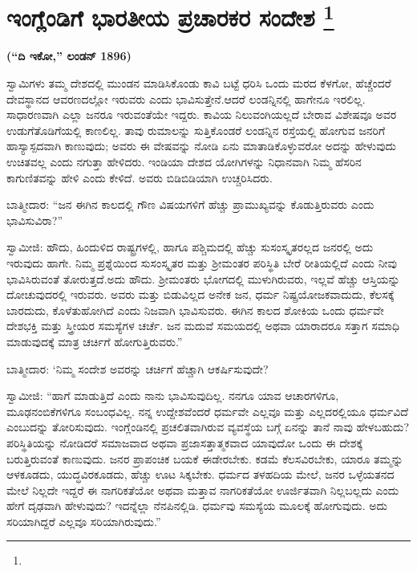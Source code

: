 
\chapter[ಇಂಗ್ಲೆಂಡಿಗೆ ಭಾರತೀಯ ಪ್ರಚಾರಕರ ಸಂದೇಶ ]{ಇಂಗ್ಲೆಂಡಿಗೆ ಭಾರತೀಯ ಪ್ರಚಾರಕರ ಸಂದೇಶ \protect\footnote{}}

\centerline{\textbf{(“ದಿ ಇಕೋ,” ಲಂಡನ್​ 1896)}}

ಸ್ವಾಮಿಗಳು ತಮ್ಮ ದೇಶದಲ್ಲಿ ಮುಂಡನ ಮಾಡಿಸಿಕೊಂಡು ಕಾವಿ ಬಟ್ಟೆ ಧರಿಸಿ ಒಂದು ಮರದ ಕೆಳಗೋ, ಹೆಚ್ಚೆಂದರೆ ದೇವಸ್ಥಾನದ ಆವರಣದಲ್ಲೋ ಇರುವರು ಎಂದು ಭಾವಿಸುತ್ತೇನೆ.\break ಆದರೆ ಲಂಡನ್ನಿನಲ್ಲಿ ಹಾಗೇನೂ ಇರಲಿಲ್ಲ. ಸಾಧಾರಣವಾಗಿ ಎಲ್ಲಾ ಜನರೂ ಇರುವಂತೆಯೇ ಇದ್ದರು. ಕಾವಿಯ ನಿಲುವಂಗಿಯಲ್ಲದೆ ಬೇರಾವ ವಿಶೇಷವೂ ಅವರ ಉಡುಗೆತೊಡಿಗೆಯಲ್ಲಿ ಕಾಣಲಿಲ್ಲ. ತಾವು ರುಮಾಲನ್ನು ಸುತ್ತಿಕೊಂಡರೆ ಲಂಡನ್ನಿನ ರಸ್ತೆಯಲ್ಲಿ ಹೋಗುವ ಜನರಿಗೆ ಹಾಸ್ಯಾಸ್ಪದವಾಗಿ ಕಾಣುವುದು; ಅವರು ಈ ವೇಷವನ್ನು ನೋಡಿ ಏನು ಮಾತಾಡಿಕೊಳ್ಳುವರೋ ಅದನ್ನು ಹೇಳುವುದು ಉಚಿತವಲ್ಲ ಎಂದು ನಗುತ್ತಾ ಹೇಳಿದರು. ಇಂಡಿಯಾ ದೇಶದ ಯೋಗಿಗಳನ್ನು ನಿಧಾನವಾಗಿ ನಿಮ್ಮ ಹೆಸರಿನ ಕಾಗುಣಿತವನ್ನು ಹೇಳಿ ಎಂದು ಕೇಳಿದೆ. ಅವರು ಬಿಡಿಬಿಡಿಯಾಗಿ ಉಚ್ಚರಿಸಿದರು.

ಬಾತ್ಮೀದಾರ: “ಜನ ಈಗಿನ ಕಾಲದಲ್ಲಿ ಗೌಣ ವಿಷಯಗಳಿಗೆ ಹೆಚ್ಚು ಪ್ರಾಮುಖ್ಯವನ್ನು ಕೊಡುತ್ತಿರುವರು ಎಂದು ಭಾವಿಸುವಿರಾ?”

ಸ್ವಾಮೀಜಿ: ಹೌದು, ಹಿಂದುಳಿದ ರಾಷ್ಟ್ರಗಳಲ್ಲಿ, ಹಾಗೂ ಪಶ್ಚಿಮದಲ್ಲಿ ಹೆಚ್ಚು ಸುಸಂಸ್ಕೃತರಲ್ಲದ ಜನರಲ್ಲಿ ಅದು ಇರುವುದು ಹಾಗೇ. ನಿಮ್ಮ ಪ್ರಶ್ನೆಯಿಂದ ಸುಸಂಸ್ಕೃತರ ಮತ್ತು ಶ‍್ರೀಮಂತರ ಪರಿಸ್ಥಿತಿ ಬೇರೆ ರೀತಿಯಲ್ಲಿದೆ ಎಂದು ನೀವು ಭಾವಿಸಿರುವಂತೆ ತೋರುತ್ತದೆ.\break ಅದು ಹೌದು. ಶ‍್ರೀಮಂತರು ಭೋಗದಲ್ಲಿ ಮುಳುಗಿರುವರು, ಇಲ್ಲವೆ ಹೆಚ್ಚು ಆಸ್ತಿಯನ್ನು ದೋಚುವುದರಲ್ಲಿ ಇರುವರು. ಅವರು ಮತ್ತು ಬಿಡುವಿಲ್ಲದ ಅನೇಕ ಜನ, ಧರ್ಮ ನಿಷ್ಪ್ರಯೋಜಕವಾದುದು, ಕೆಲಸಕ್ಕೆ ಬಾರದುದು, ಕೊಳೆತುಹೋಗಿದೆ ಎಂದು ನಿಜವಾಗಿ ಭಾವಿಸುವರು. ಈಗಿನ ಕಾಲದ ಶೋಕಿಯ ಒಂದು ಧರ್ಮವೇ ದೇಶಭಕ್ತಿ ಮತ್ತು ಸ್ತ್ರೀಯರ ಸಮಸ್ಯೆಗಳ ಚರ್ಚೆ. ಜನ ಮದುವೆ ಸಮಯದಲ್ಲಿ ಅಥವಾ ಯಾರಾದರೂ ಸತ್ತಾಗ ಸಮಾಧಿ ಮಾಡುವುದಕ್ಕೆ ಮಾತ್ರ ಚರ್ಚಿಗೆ ಹೋಗುತ್ತಿರುವರು.”

ಬಾತ್ಮೀದಾರ: ‘ನಿಮ್ಮ ಸಂದೇಶ ಅವರನ್ನು ಚರ್ಚಿಗೆ ಹೆಚ್ಚಾಗಿ ಆಕರ್ಷಿಸುವುದೇ?

ಸ್ವಾಮೀಜಿ: “ಹಾಗೆ ಮಾಡುತ್ತಿದೆ ಎಂದು ನಾನು ಭಾವಿಸುವುದಿಲ್ಲ. ನನಗೂ ಯಾವ ಆಚಾರಗಳಿಗೂ, ಮೂಢನಂಬಿಕೆಗಳಿಗೂ ಸಂಬಂಧವಿಲ್ಲ. ನನ್ನ ಉದ್ದೇಶವೆಂದರೆ ಧರ್ಮವೇ ಎಲ್ಲವೂ ಮತ್ತು ಎಲ್ಲದರಲ್ಲಿಯೂ ಧರ್ಮವಿದೆ ಎಂಬುದನ್ನು ತೋರಿಸುವುದು. ಇಂಗ್ಲೆಂಡಿನಲ್ಲಿ ಪ್ರಚಲಿತವಾಗಿರುವ ವ್ಯವಸ್ಥೆಯ ಬಗ್ಗೆ ಏನನ್ನು ತಾನೆ ನಾವು ಹೇಳಬಹುದು? ಪರಿಸ್ಥಿತಿಯನ್ನು ನೋಡಿದರೆ ಸಮಾಜವಾದ ಅಥವಾ ಪ್ರಜಾಸತ್ತಾತ್ಮಕವಾದ ಯಾವುದೋ ಒಂದು ಈ ದೇಶಕ್ಕೆ ಬರುತ್ತಿರುವಂತೆ ಕಾಣುವುದು. ಜನರ ಪ್ರಾಪಂಚಿಕ ಬಯಕೆ ಈಡೇರಬೇಕು. ಕಡಮೆ ಕೆಲಸವಿರಬೇಕು, ಯಾರೂ ತಮ್ಮನ್ನು ಆಳಕೂಡದು, ಯುದ್ಧವಿರಕೂಡದು, ಹೆಚ್ಚು ಊಟ ಸಿಕ್ಕಬೇಕು. ಧರ್ಮದ ತಳಹದಿಯ ಮೇಲೆ, ಜನರ ಒಳ್ಳೆಯತನದ ಮೇಲೆ ನಿಲ್ಲದೇ ಇದ್ದರೆ ಈ ನಾಗರಿಕತೆಯೋ ಅಥವಾ ಮತ್ತಾವ ನಾಗರಿಕತೆಯೋ ಊರ್ಜಿತವಾಗಿ ನಿಲ್ಲಬಲ್ಲದು ಎಂದು ಹೇಗೆ ದೃಢವಾಗಿ ಹೇಳುವುದು? ಇದನ್ನೆಲ್ಲಾ ನೆನಪಿನಲ್ಲಿಡಿ. ಧರ್ಮವು ಸಮಸ್ಯೆಯ ಮೂಲಕ್ಕೆ ಹೋಗುವುದು. ಅದು ಸರಿಯಾಗಿದ್ದರೆ ಎಲ್ಲವೂ ಸರಿಯಾಗಿರುವುದು.”

